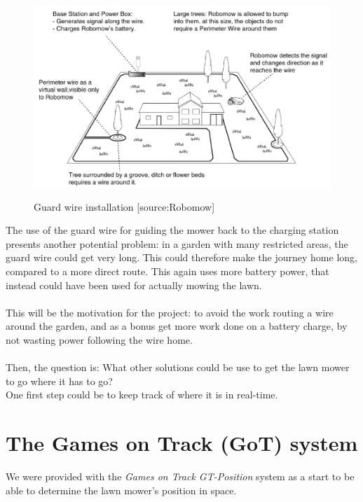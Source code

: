  
\begin{figure}[H]
\centering
\includegraphics[scale=0.6]{figures/robomow.png} 
\label{fig:robomow}
\caption{Guard wire installation [source:Robomow]} 
\end{figure}
\noindent

The use of the guard wire for guiding the mower back to the charging station presents another potential problem: in a garden with many restricted areas, the guard wire could get very long. This could therefore make the journey home long, compared to a more direct route. This again uses more battery power, that instead could have been used for actually mowing the lawn.\\\\
\noindent
This will be the motivation for the project: to avoid the work routing a wire around the garden, and as a bonus get more work done on a battery charge, by not wasting power following the wire home.\\\\
\noindent
Then, the question is: What other solutions could be use to get the lawn mower to go where it has to go? \\
One first step could be to keep track of where it is in real-time.
\section{The Games on Track (GoT) system}
We were provided with the \emph{Games on Track GT-Position} system as a start to be able to determine the lawn mower's position in space. 

